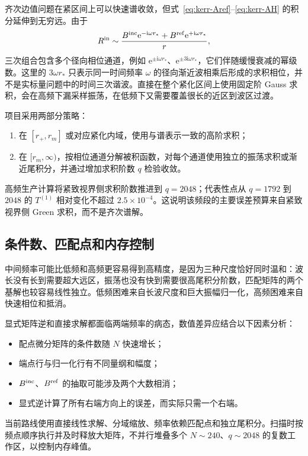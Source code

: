 \documentclass[UTF8,fontset=fandol,11pt,a4paper,oneside]{ctexart}
\numberwithin{equation}{section}
\newcommand{\ii}{\mathrm i}
\newcommand{\ee}{\mathrm e}
\newcommand{\Bin}{B^{\rm inc}}
\newcommand{\Bref}{B^{\rm ref}}
\begin{document}
齐次边值问题在紧区间上可以快速谱收敛，但式~\eqref{eq:kerr-Aref}--\eqref{eq:kerr-AH} 的积分延伸到无穷远。由于
\begin{equation}
R^{\rm in}\sim\frac{\Bin\ee^{-\ii\omega r_*}+\Bref\ee^{+\ii\omega r_*}}{r},
\end{equation}
三次组合包含多个径向相位通道，例如 $\ee^{\pm\ii\omega r_*}$、$\ee^{\pm3\ii\omega r_*}$，它们伴随缓慢衰减的幂级数。这里的 $3\omega r_*$ 只表示同一时间频率 $\omega$ 的径向渐近波相乘后形成的求积相位，并不是实标量问题中的时间三次谐波。直接在整个紧化区间上使用固定阶 Gauss 求积，会在高频下漏采样振荡，在低频下又需要覆盖很长的近区到波区过渡。

项目采用两部分策略：
\begin{enumerate}
\item 在 $[r_+,\allowbreak r_m]$ 或对应紧化内域，使用与谱表示一致的高阶求积；
\item 在 $[r_m,\allowbreak \infty)$，按相位通道分解被积函数，对每个通道使用独立的振荡求积或渐近尾积分，并通过增加求积阶数 $q$ 检验收敛。
\end{enumerate}
高频生产计算将紧致视界侧求积阶数推进到 $q=2048$；代表性点从 $q=1792$ 到 $2048$ 的 $T^{(1)}$ 相对变化不超过 $2.5\times10^{-4}$。这说明该频段的主要误差预算来自紧致视界侧 Green 求积，而不是齐次谱解。

\subsection{条件数、匹配点和内存控制}

中间频率可能比低频和高频更容易得到高精度，是因为三种尺度恰好同时温和：波长没有长到需要超大远区，振荡也没有快到需要很高尾积分阶数，匹配矩阵的两个基解也较容易线性独立。低频困难来自长波尺度和巨大振幅归一化，高频困难来自快速相位和抵消。

显式矩阵逆和直接求解都面临两端频率的病态，数值差异应结合以下因素分析：
\begin{itemize}
\item 配点微分矩阵的条件数随 $N$ 快速增长；
\item 端点行与归一化行有不同量纲和幅度；
\item $\Bin$、$\Bref$ 的抽取可能涉及两个大数相消；
\item 显式逆计算了所有右端方向上的误差，而实际只需一个右端。
\end{itemize}
当前路线使用直接线性求解、分域缩放、频率依赖匹配点和独立尾积分。扫描时按频点顺序执行并及时释放大矩阵，不并行堆叠多个 $N\sim240$、$q\sim2048$ 的复数工作区，以控制内存峰值。
\end{document}
